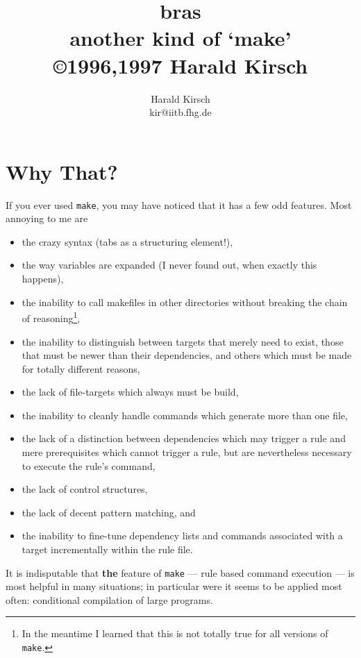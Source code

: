 \documentclass[12pt]{article}
\title{\textsf{bras}\\
another kind of `make'\\
\small \copyright 1996,1997 Harald Kirsch}
\author{\relax
Harald Kirsch\\
kir@iitb.fhg.de}
\newcommand{\make}{\texttt{make}}
\begin{document}
\maketitle
\tableofcontents

\section{Why That?}
If you ever used \texttt{make}, you may have noticed that it has a few
odd features. Most annoying to me are

\begin{itemize}
\item 
the crazy syntax (tabs as a structuring element!),
\item 
the way variables are expanded (I never found out, when exactly
this happens),
\item 
the inability to call makefiles in other directories without
breaking the chain of reasoning\footnote{In the meantime I learned
  that this is not totally true for all versions of \make.},
\item 
the inability to distinguish between targets that merely need to
  exist, those that must be newer than their dependencies, and others
  which must be made for totally different reasons,
\item 
the lack of file-targets which always must be build,
\item 
the inability to cleanly handle commands which generate more
than one file,
\item 
the lack of a distinction between dependencies which may trigger
a rule and mere prerequisites which cannot trigger a rule, but are
nevertheless necessary to execute the rule's command,
\item 
the lack of control structures,
\item 
the lack of decent pattern matching, and
\item 
the inability to fine-tune dependency lists and commands associated
with a target incrementally within the rule file.
\end{itemize}

It is indisputable that \textbf{the} feature of \texttt{make} ---
rule based command execution --- is most helpful in many situations;
in particular were it seems to be applied most often:
conditional compilation of large programs.
\end{document}
